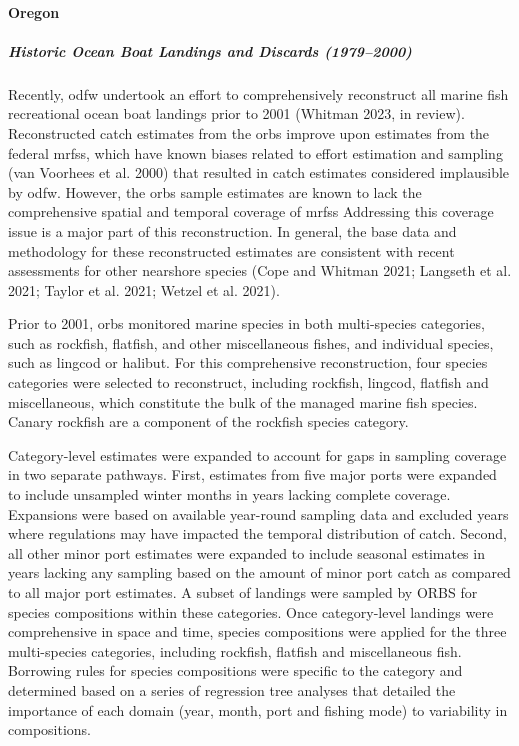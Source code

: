 \documentclass[11pt,
  english,
  letterpaper,
]{article}
\begin{document}
\hypertarget{oregon-1}{%
\paragraph{Oregon}\label{oregon-1}}

\hypertarget{historic-ocean-boat-landings-and-discards-19792000}{%
\subparagraph{Historic Ocean Boat Landings and Discards (1979--2000)}\label{historic-ocean-boat-landings-and-discards-19792000}}

Recently, \gls{odfw} undertook an effort to comprehensively reconstruct all marine fish recreational ocean boat landings prior to 2001 (Whitman 2023, in review). Reconstructed catch estimates from the \gls{orbs} improve upon estimates from the federal \gls{mrfss}, which have known biases related to effort estimation and sampling (van Voorhees et al. 2000) that resulted in catch estimates considered implausible by \gls{odfw}. However, the \gls{orbs} sample estimates are known to lack the comprehensive spatial and temporal coverage of \gls{mrfss} Addressing this coverage issue is a major part of this reconstruction. In general, the base data and methodology for these reconstructed estimates are consistent with recent assessments for other nearshore species (Cope and Whitman 2021; Langseth et al. 2021; Taylor et al. 2021; Wetzel et al. 2021).

Prior to 2001, \gls{orbs} monitored marine species in both multi-species categories, such as rockfish, flatfish, and other miscellaneous fishes, and individual species, such as lingcod or halibut. For this comprehensive reconstruction, four species categories were selected to reconstruct, including rockfish, lingcod, flatfish and miscellaneous, which constitute the bulk of the managed marine fish species. Canary rockfish are a component of the rockfish species category.

Category-level estimates were expanded to account for gaps in sampling coverage in two separate pathways. First, estimates from five major ports were expanded to include unsampled winter months in years lacking complete coverage. Expansions were based on available year-round sampling data and excluded years where regulations may have impacted the temporal distribution of catch. Second, all other minor port estimates were expanded to include seasonal estimates in years lacking any sampling based on the amount of minor port catch as compared to all major port estimates. A subset of landings were sampled by ORBS for species compositions within these categories. Once category-level landings were comprehensive in space and time, species compositions were applied for the three multi-species categories, including rockfish, flatfish and miscellaneous fish. Borrowing rules for species compositions were specific to the category and determined based on a series of regression tree analyses that detailed the importance of each domain (year, month, port and fishing mode) to variability in compositions.
\end{document}
